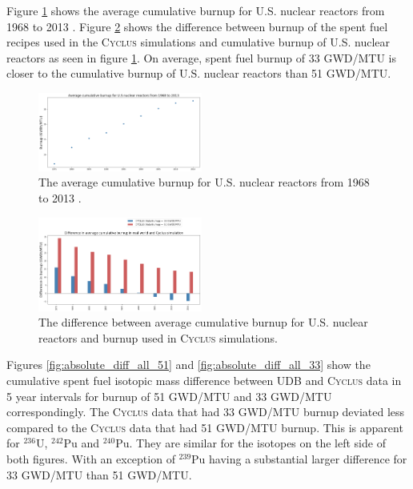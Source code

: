 \documentclass{anstrans}
\newcommand{\Cyclus}{\textsc{Cyclus}\xspace}%
\begin{document}
Figure \ref{fig:burn_up_real} shows the average cumulative burnup for U.S. 
nuclear reactors from 1968 to 2013 \cite{eia_spent_2015}. Figure 
\ref{fig:burn_up_difference} shows the difference between burnup of the spent 
fuel recipes used in the \Cyclus simulations and cumulative burnup of U.S. 
nuclear reactors as seen in figure \ref{fig:burn_up_real}. On average, spent 
fuel burnup of 33 GWD/MTU is closer to the cumulative burnup of U.S. nuclear 
reactors than 51 GWD/MTU. 

\begin{figure}[t] %
	\centering
	\includegraphics[width=0.48\textwidth]{figures/burn_up_real}
	\caption{The average cumulative burnup for U.S. nuclear reactors from 1968 to 2013 \cite{eia_spent_2015}.}
	\label{fig:burn_up_real}
\end{figure} 

\begin{figure}[t] %
	\centering
	\includegraphics[width=0.48\textwidth]{figures/burn_up_difference}
	\caption{The difference between average cumulative burnup for U.S. nuclear reactors and burnup used in \Cyclus simulations.}
	\label{fig:burn_up_difference}
\end{figure} 

Figures \ref{fig:absolute_diff_all_51} and \ref{fig:absolute_diff_all_33} show 
the cumulative spent fuel isotopic mass difference between \gls{UDB} and \Cyclus data 
in 5 year intervals for burnup of 51 GWD/MTU and 33 GWD/MTU correspondingly. 
The \Cyclus data that had 33 GWD/MTU burnup deviated less compared to the 
\Cyclus data that had 51 GWD/MTU burnup. This is apparent for $^{236}$U, 
$^{242}$Pu and $^{240}$Pu. They are similar for the isotopes on the left side 
of both figures. With an exception of $^{239}$Pu having a substantial larger 
difference for 33 GWD/MTU than 51 GWD/MTU. 
\end{document}
